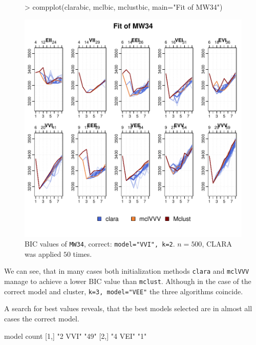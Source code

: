 \begin{figure}[h!]
    \begin{Rgraph}[0.9]
\begin{Schunk}
\begin{Sinput}
>     compplot(clarabic, mclbic, mclustbic, main="Fit of MW34")
\end{Sinput}
\end{Schunk}
\includegraphics{chapter3-figMW34bic}
    \caption{BIC values of {\tt MW34}, correct: {\tt model="VVI", k=2}. 
             $n=500$, CLARA was applied $50$ times.}
    \label{fig:bicMW34}
    \end{Rgraph}
\end{figure}

We can see, that in many cases both initialization methods {\tt clara} and
{\tt mclVVV} manage to achieve a lower BIC value than {\tt mclust}. Although in
the case of the correct model and cluster, {\tt k=3, model="VEE"} the three 
algorithms coincide.

A search for best values reveals, that the best models selected are in almost 
all cases the correct model.

\begin{Schunk}
\begin{Soutput}
     model   count
[1,] "2 VVI" "49" 
[2,] "4 VEI" "1"  
\end{Soutput}
\end{Schunk}

